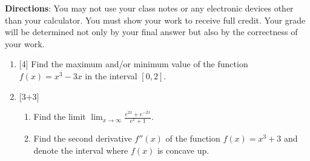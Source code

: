 \documentclass[12pt]{article}
\begin{document}
\bigskip

{\bf Directions}: You may not use your class notes or any electronic devices other than your calculator. You must show your work to receive full credit. Your grade will be determined not only by your final answer but also by the correctness of your work.



\begin{enumerate}
\item{}[4]
Find the maximum and/or minimum value of the function $f(x)=x^3-3x$ in the interval $[0,2]$.




\vfill


\item{}[3+3]\begin{enumerate}
             \item Find the limit $\displaystyle{\lim_{x\to \infty}}\frac{e^{2x}+e^{-2x}}{e^x+1}$.
             \item Find the second derivative $f''(x)$ of the function $f(x)=x^3+3$ and denote the interval where $f(x)$ is concave up.
            \end{enumerate}



\vfill
 
\newpage

\newline \newline{}
\end{enumerate}
\newpage



 
\end{document}
